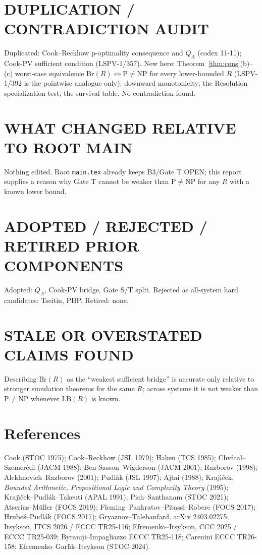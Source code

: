 \documentclass[11pt]{article}
\theoremstyle{definition}
\theoremstyle{remark}
\newcommand{\Br}{\mathrm{Br}}
\newcommand{\LB}{\mathrm{LB}}
\begin{document}
\section*{DUPLICATION / CONTRADICTION AUDIT}
Duplicated: Cook--Reckhow p-optimality consequence and $Q_A$ (codex 11-11); Cook-PV sufficient condition (LSPV-1/357).
New here: Theorem~\ref{thm:cons}(b)--(c) worst-case equivalence $\Br(R)\iff\mathrm{P}\ne\mathrm{NP}$ for every
lower-bounded $R$ (LSPV-1/392 is the pointwise analogue only); downward monotonicity; the Resolution specialization test;
the survival table. No contradiction found.

\section*{WHAT CHANGED RELATIVE TO ROOT MAIN}
Nothing edited. Root \texttt{main.tex} already keeps B3/Gate T OPEN; this report supplies a reason why Gate T
cannot be weaker than P$\ne$NP for any $R$ with a known lower bound.

\section*{ADOPTED / REJECTED / RETIRED PRIOR COMPONENTS}
Adopted: $Q_A$, Cook-PV bridge, Gate S/T split. Rejected as all-system hard candidates: Tseitin, PHP. Retired: none.

\section*{STALE OR OVERSTATED CLAIMS FOUND}
Describing $\Br(R)$ as the ``weakest sufficient bridge'' is accurate only relative to stronger simulation theorems
for the same $R$; across systems it is not weaker than P$\ne$NP whenever $\LB(R)$ is known.

\section*{References}
Cook (STOC 1975); Cook--Reckhow (JSL 1979); Haken (TCS 1985); Chv\'atal--Szemer\'edi (JACM 1988);
Ben-Sasson--Wigderson (JACM 2001); Razborov (1998); Alekhnovich--Razborov (2001); Pudl\'ak (JSL 1997);
Ajtai (1988); Kraj\'\i\v{c}ek, \emph{Bounded Arithmetic, Propositional Logic and Complexity Theory} (1995);
Kraj\'\i\v{c}ek--Pudl\'ak--Takeuti (APAL 1991); Pich--Santhanam (STOC 2021);
Atserias--M\"uller (FOCS 2019); Fleming--Pankratov--Pitassi--Robere (FOCS 2017); Hrube\v{s}--Pudl\'ak (FOCS 2017);
Gryaznov--Talebanfard, arXiv 2403.02275; Itsykson, ITCS 2026 / ECCC TR25-116; Efremenko--Itsykson, CCC 2025 / ECCC TR25-039;
Byramji--Impagliazzo ECCC TR25-118; Carenini ECCC TR26-158; Efremenko--Garl\'\i k--Itsykson (STOC 2024).
\end{document}
